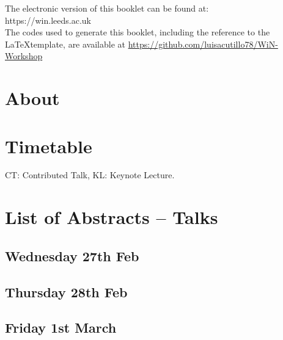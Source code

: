 \documentclass[openany, parskip=full, 12pt, a4]{scrbook}
\begin{document}
	
	
	
\mbox{}
\thispagestyle{empty}
\vfill
\begin{center}
	The electronic version of this booklet can be found at: \\
	https://win.leeds.ac.uk\\
	
	
	The codes used to generate this booklet, including the reference to the \LaTeX\space template, are available at \url{https://github.com/luisacutillo78/WiN-Workshop}
\end{center}

\newpage

\tableofcontents

\chapter{About}



\chapter{Timetable}

CT: Contributed Talk, KL: Keynote Lecture.


\chapter{List of Abstracts -- Talks}

\section{Wednesday 27th Feb}

\section{Thursday 28th Feb}


\section{Friday 1st March}
\end{document}
